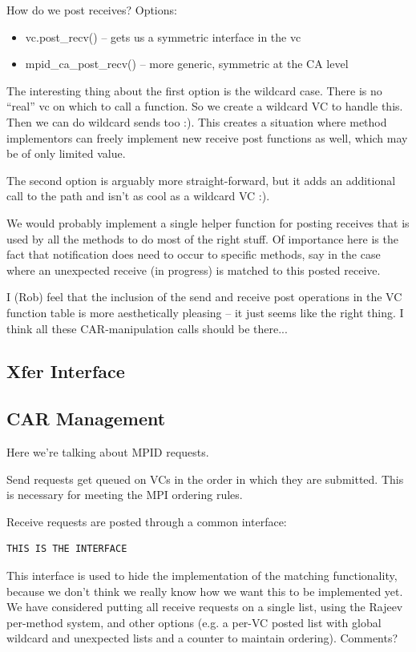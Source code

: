 \documentclass[11pt,letterpaper]{article}
\begin{document}
How do we post receives?  Options:
\begin{itemize}
\item vc.post\_recv() -- gets us a symmetric interface in the vc
\item mpid\_ca\_post\_recv() -- more generic, symmetric at the CA level
\end{itemize}

The interesting thing about the first option is the wildcard case.  There is no
``real'' vc on which to call a function.  So we create a wildcard VC to handle
this.  Then we can do wildcard sends too :).  This creates a situation where
method implementors can freely implement new receive post functions as well,
which may be of only limited value.

The second option is arguably more straight-forward, but it adds an additional
call to the path and isn't as cool as a wildcard VC :).

%
%
We would probably implement a single helper function for posting receives that
is used by all the methods to do most of the right stuff.  Of importance here
is the fact that notification does need to occur to specific methods, say in
the case where an unexpected receive (in progress) is matched to this posted
receive.

I (Rob) feel that the inclusion of the send and receive post operations in the
VC function table is more aesthetically pleasing -- it just seems like the
right thing.  I think all these CAR-manipulation calls should be there...

%
%
\subsection{Xfer Interface}


\subsection{CAR Management}

Here we're talking about MPID requests.

Send requests get queued on VCs in the order in which they are submitted.  This
is necessary for meeting the MPI ordering rules.

Receive requests are posted through a common interface:
\begin{verbatim}
THIS IS THE INTERFACE
\end{verbatim}
This interface is used to hide the implementation of the matching
functionality, because we don't think we really know how we want this to be
implemented yet.  We have considered putting all receive requests on a single
list, using the Rajeev per-method system, and other options (e.g. a per-VC
posted list with global wildcard and unexpected lists and a counter to
maintain ordering).  Comments?
\end{document}

